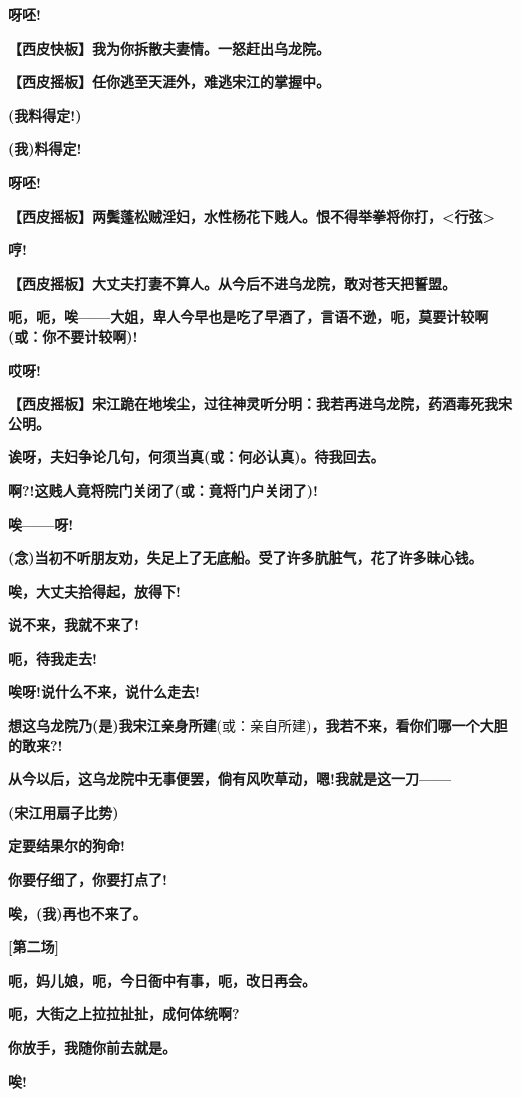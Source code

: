 \textbf{呀呸!}

\textbf{【西皮快板】我为你拆散夫妻情。一怒赶出乌龙院。}

\textbf{【西皮摇板】任你逃至天涯外，难逃宋江的掌握中。}

\textbf{(我料得定!)}

\textbf{(我)料得定!}

\textbf{呀呸!}

\textbf{【西皮摇板】两鬓蓬松贼淫妇，水性杨花下贱人。恨不得举拳将你打，\textless{}行弦\textgreater{}}

\textbf{哼!}

\textbf{【西皮摇板】大丈夫打妻不算人。从今后不进乌龙院，敢对苍天把誓盟。}

\textbf{呃，呃，唉------大姐，卑人今早也是吃了早酒了，言语不逊，呃，莫要计较啊(或：你不要计较啊)!}

\textbf{哎呀!}

\textbf{【西皮摇板】宋江跪在地埃尘，过往神灵听分明：我若再进乌龙院，药酒毒死我宋公明。}

\textbf{诶呀，夫妇争论几句，何须当真(或：何必认真)。待我回去。}

\textbf{啊?!这贱人竟将院门关闭了(或：竟将门户关闭了)!}

\textbf{唉------呀!}

\textbf{(念)当初不听朋友劝，失足上了无底船。受了许多肮脏气，花了许多昧心钱。}

\textbf{唉，大丈夫拾得起，放得下!}

\textbf{说不来，我就不来了!}

\textbf{呃，待我走去!}

\textbf{唉呀!说什么不来，说什么走去!}

\textbf{想这乌龙院乃(是)我宋江亲身所建}(或：亲自所建)\textbf{，我若不来，看你们哪一个大胆的敢来?!}

\textbf{从今以后，这乌龙院中无事便罢，倘有风吹草动，嗯!我就是这一刀------}

\textbf{(宋江用扇子比势)}

\textbf{定要结果尔的狗命!}

\textbf{你要仔细了，你要打点了!}

\textbf{唉，(我)再也不来了。}

\textbf{{[}第二场{]}}

\textbf{呃，妈儿娘，呃，今日衙中有事，呃，改日再会。}

\textbf{呃，大街之上拉拉扯扯，成何体统啊?}

\textbf{你放手，我随你前去就是。}

\textbf{唉!}

